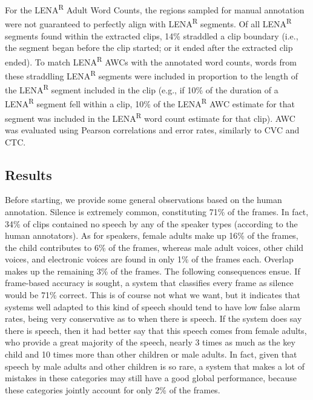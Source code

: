 \documentclass[english,table,man,floatsintext]{apa6}
\begin{document}
For the LENA\textsuperscript{R} Adult Word Counts, the regions sampled for manual annotation were not guaranteed to perfectly align with LENA\textsuperscript{R} segments. Of all LENA\textsuperscript{R} segments found within the extracted clips, 14\% straddled a clip boundary (i.e., the segment began before the clip started; or it ended after the extracted clip ended). To match LENA\textsuperscript{R} AWCs with the annotated word counts, words from these straddling LENA\textsuperscript{R} segments were included in proportion to the length of the LENA\textsuperscript{R} segment included in the clip (e.g., if 10\% of the duration of a LENA\textsuperscript{R} segment fell within a clip, 10\% of the LENA\textsuperscript{R} AWC estimate for that segment was included in the LENA\textsuperscript{R} word count estimate for that clip). AWC was evaluated using Pearson correlations and error rates, similarly to CVC and CTC.

\hypertarget{results}{%
\subsection{Results}\label{results}}

Before starting, we provide some general observations based on the human annotation. Silence is extremely common, constituting 71\% of the frames. In fact, 34\% of clips contained no speech by any of the speaker types (according to the human annotators). As for speakers, female adults make up 16\% of the frames, the child contributes to 6\% of the frames, whereas male adult voices, other child voices, and electronic voices are found in only 1\% of the frames each. Overlap makes up the remaining 3\% of the frames. The following consequences ensue. If frame-based accuracy is sought, a system that classifies every frame as silence would be 71\% correct. This is of course not what we want, but it indicates that systems well adapted to this kind of speech should tend to have low false alarm rates, being very conservative as to when there is speech. If the system does say there is speech, then it had better say that this speech comes from female adults, who provide a great majority of the speech, nearly 3 times as much as the key child and 10 times more than other children or male adults. In fact, given that speech by male adults and other children is so rare, a system that makes a lot of mistakes in these categories may still have a good global performance, because these categories jointly account for only 2\% of the frames.
\end{document}
